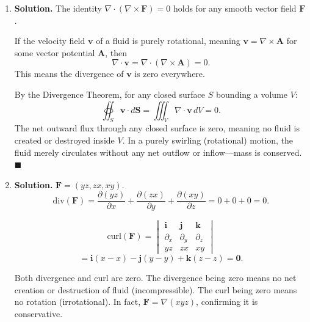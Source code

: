 \begin{enumerate}
\begin{enumerate}
\item $\mathbf{F}_2=(2x,2y)$:
\[
\text{div}(\mathbf{F}_2)=2+2=4>0, \quad \text{curl}(\mathbf{F}_2)=0-0=0.
\]
Divergence is positive, curl is zero. The origin is a \textbf{source}.

\item $\mathbf{F}_3=(-y,x)$:
\[
\text{div}(\mathbf{F}_3)=0+0=0, \quad \text{curl}(\mathbf{F}_3)=1-(-1)=2.
\]
Divergence is zero, curl is nonzero. The origin is a \textbf{rotation} (counterclockwise).
\end{enumerate}

\item \textbf{Solution.}
The identity $\nabla\cdot(\nabla\times\mathbf{F})=0$ holds for any smooth vector field $\mathbf{F}$.

If the velocity field $\mathbf{v}$ of a fluid is purely rotational, meaning $\mathbf{v}=\nabla\times\mathbf{A}$ for some vector potential $\mathbf{A}$, then
\[
\nabla\cdot\mathbf{v} = \nabla\cdot(\nabla\times\mathbf{A})=0.
\]
This means the divergence of $\mathbf{v}$ is zero everywhere.

By the Divergence Theorem, for any closed surface $S$ bounding a volume $V$:
\[
\oiint_S \mathbf{v}\cdot d\mathbf{S} = \iiint_V\nabla\cdot\mathbf{v}\,dV = 0.
\]
The net outward flux through any closed surface is zero, meaning no fluid is created or destroyed inside $V$. In a purely swirling (rotational) motion, the fluid merely circulates without any net outflow or inflow---mass is conserved. $\blacksquare$

\item \textbf{Solution.}
$\mathbf{F}=(yz, zx, xy)$.
\[
\text{div}(\mathbf{F}) = \frac{\partial(yz)}{\partial x}+\frac{\partial(zx)}{\partial y}+\frac{\partial(xy)}{\partial z} = 0+0+0 = \boxed{0}.
\]

\[
\text{curl}(\mathbf{F}) = \begin{vmatrix}\mathbf{i}&\mathbf{j}&\mathbf{k}\\ \partial_x&\partial_y&\partial_z\\ yz&zx&xy\end{vmatrix}
\]
\[
= \mathbf{i}(x-x)-\mathbf{j}(y-y)+\mathbf{k}(z-z) = \boxed{\mathbf{0}}.
\]

Both divergence and curl are zero. The divergence being zero means no net creation or destruction of fluid (incompressible). The curl being zero means no rotation (irrotational). In fact, $\mathbf{F}=\nabla(xyz)$, confirming it is conservative.


\end{enumerate}
